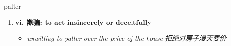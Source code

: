 
\begin{frame}
{\huge palter}
\begin{center}
\begin{enumerate}\Large
  \item \textbf{vi. 欺骗: to act insincerely or deceitfully}
  \begin{itemize}
    \item \em{\Large{unwilling to palter over the price of the house 拒绝对房子漫天要价}}
  \end{itemize}
\end{enumerate}
\end{center}
\end{frame}
